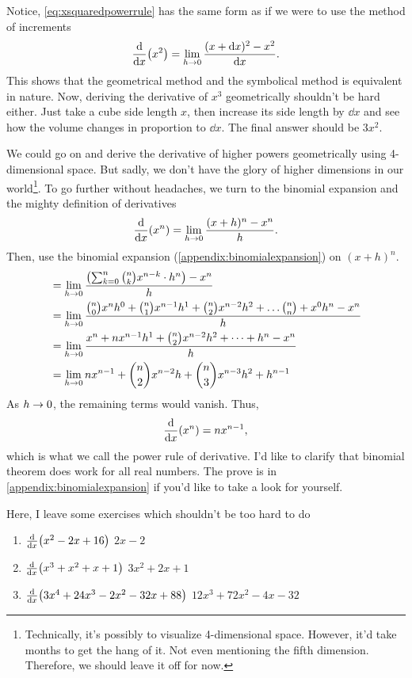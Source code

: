 Notice, \cref{eq:xsquaredpowerrule} has the same form as if we were to use the method of increments
\begin{equation*}
    \dv{x}(x^2) = \lim_{h\rightarrow 0}\frac{(x + \dd{x})^2 - x^2}{\dd{x}}.
\end{equation*}
This shows that the geometrical method and the symbolical method is equivalent in nature. Now, deriving the derivative of $x^3$ geometrically shouldn't be hard either. Just take a cube side length $x$, then increase its side length by $\dd{x}$ and see how the volume changes in proportion to $\dd{x}$. The final answer should be $3x^2$.

We could go on and derive the derivative of higher powers geometrically using 4-dimensional space. But sadly, we don't have the glory of higher dimensions in our world\footnote{Technically, it's possibly to visualize 4-dimensional space. However, it'd take months to get the hang of it. Not even mentioning the fifth dimension. Therefore, we should leave it off for now.}. To go further without headaches, we turn to the binomial expansion and the mighty definition of derivatives
\begin{equation*}
    \dv{x}(x^n) = \lim_{h \rightarrow 0}\frac{(x + h)^n - x^n}{h}.
\end{equation*}
Then, use the binomial expansion (\cref{appendix:binomialexpansion}) on $(x + h)^n$.
\begin{align*}
    &= \lim_{h \rightarrow 0}\frac{\left(\sum_{k = 0}^n{n\choose k}x^{n - k}\cdot h^n\right) - x^n}{h} \\
    &= \lim_{h \rightarrow 0}{{n\choose 0}x^nh^0 + {n\choose 1}x^{n - 1}h^1 + {n\choose 2}x^{n - 2}h^2 +\dots {n\choose n} + x^0h^n - x^n\over h} \\
    &= \lim_{h \rightarrow 0}\frac{x^n + nx^{n - 1}h^1 + {n\choose 2}x^{n - 2}h^2 + \dots + h^n -x^n}{h} \\
    &= \lim_{h \rightarrow 0}nx^{n - 1} + {n\choose 2}x^{n - 2}h + {n\choose 3}x^{n - 3}h^2 + h^{n - 1}
\end{align*}
As $h\rightarrow 0$, the remaining terms would vanish. Thus,
\begin{equation}
    \dv{x}(x^n) = nx^{n - 1}, \label{eq:derivativepowerrule}
\end{equation}
which is what we call the power rule of derivative. I'd like to clarify that binomial theorem does work for all real numbers. The prove is in \cref{appendix:binomialexpansion} if you'd like to take a look for yourself.

Here, I leave some exercises which shouldn't be too hard to do
\begin{enumerate}
    \item $\dv{x}(x^2 - 2x + 16)$ \hfill $2x - 2$
    \item $\dv{x}(x^3 + x^2 + x + 1)$ \hfill $3x^2 + 2x + 1$
    \item $\dv{x}(3x^4 + 24x^3 - 2x^2 - 32x + 88)$ \hfill $12x^3 + 72x^2 - 4x - 32$
\end{enumerate}

